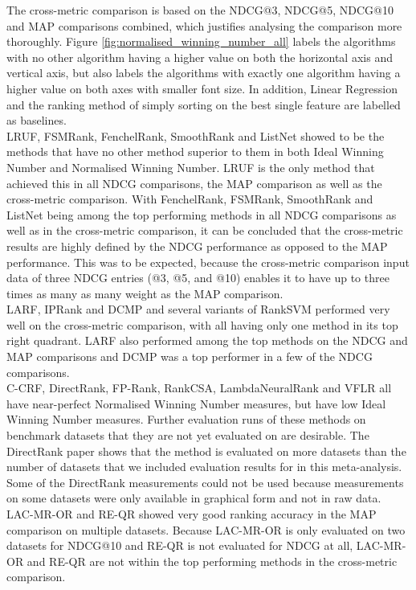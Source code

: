 \documentclass{sig-alternate-2013}
\begin{document}
The cross-metric comparison is based on the NDCG@3, NDCG@5, NDCG@10 and MAP comparisons combined, which justifies analysing the comparison more thoroughly. Figure \ref{fig:normalised_winning_number_all} labels the algorithms with no other algorithm having a higher value on both the horizontal axis and vertical axis, but also labels the algorithms with exactly one algorithm having a higher value on both axes with smaller font size. In addition, Linear Regression and the ranking method of simply sorting on the best single feature are labelled as baselines.\\

LRUF, FSMRank, FenchelRank, SmoothRank and ListNet showed to be the methods that have no other method superior to them in both Ideal Winning Number and Normalised Winning Number. LRUF is the only method that achieved this in all NDCG comparisons, the MAP comparison as well as the cross-metric comparison. With FenchelRank, FSMRank, SmoothRank and ListNet being among the top performing methods in all NDCG comparisons as well as in the cross-metric comparison, it can be concluded that the cross-metric results are highly defined by the NDCG performance as opposed to the MAP performance. This was to be expected, because the cross-metric comparison input data of three NDCG entries (@3, @5, and @10) enables it to have up to three times as many as many weight as the MAP comparison.\\

LARF, IPRank and DCMP and several variants of RankSVM performed very well on the cross-metric comparison, with all having only one method in its top right quadrant. LARF also performed among the top methods on the NDCG and MAP comparisons and DCMP was a top performer in a few of the NDCG comparisons.\\

C-CRF, DirectRank, FP-Rank, RankCSA, LambdaNeuralRank and VFLR all have near-perfect Normalised Winning Number measures, but have low Ideal Winning Number measures. Further evaluation runs of these methods on benchmark datasets that they are not yet evaluated on are desirable. The DirectRank paper \cite{Tan2013} shows that the method  is evaluated on more datasets than the number of datasets that we included evaluation results for in this meta-analysis. Some of the DirectRank measurements could not be used because measurements on some datasets were only available in graphical form and not in raw data.\\

LAC-MR-OR and RE-QR showed very good ranking accuracy in the MAP comparison on multiple datasets. Because LAC-MR-OR is only evaluated on two datasets for NDCG@10 and RE-QR is not evaluated for NDCG at all, LAC-MR-OR and RE-QR are not within the top performing methods in the cross-metric comparison. 
\end{document}
